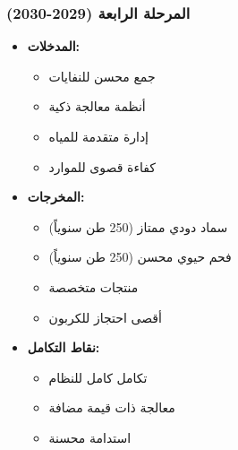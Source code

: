 \subsubsection{المرحلة الرابعة (2029-2030)}
\begin{itemize}
    \item \textbf{المدخلات:}
    \begin{itemize}
        \item جمع محسن للنفايات
        \item أنظمة معالجة ذكية
        \item إدارة متقدمة للمياه
        \item كفاءة قصوى للموارد
    \end{itemize}
    \item \textbf{المخرجات:}
    \begin{itemize}
        \item سماد دودي ممتاز (250 طن سنوياً)
        \item فحم حيوي محسن (250 طن سنوياً)
        \item منتجات متخصصة
        \item أقصى احتجاز للكربون
    \end{itemize}
    \item \textbf{نقاط التكامل:}
    \begin{itemize}
        \item تكامل كامل للنظام
        \item معالجة ذات قيمة مضافة
        \item استدامة محسنة
    \end{itemize}
\end{itemize}

